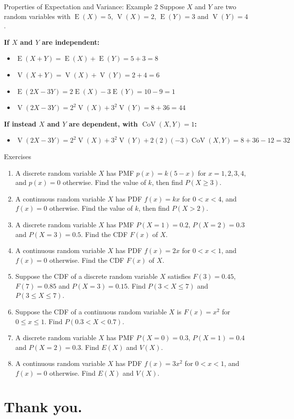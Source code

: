 \documentclass[12pt, aspectratio=169]{beamer}
\DeclareMathOperator{\E}{E}
\DeclareMathOperator{\V}{V}
\begin{document}
	\begin{frame}{Properties of Expectation and Variance: Example 2}
		Suppose $X$ and $Y$ are two random variables with \(\E(X) = 5\), \(\V(X)=2\), \(\E(Y) = 3\) and \(\V(Y) = 4\).

		\vspace{0.5em}

		\textbf{If $X$ and $Y$ are independent:}
		\begin{itemize}
			\item \(\E(X+Y) = \E(X) + \E(Y) = 5 + 3 = 8\)
			\item \(\V(X+Y) = \V(X) + \V(Y) = 2 + 4 = 6\)
			\item \(\E(2X - 3Y) = 2\E(X) - 3\E(Y) = 10 - 9 = 1\)
			\item \(\V(2X - 3Y) = 2^2\V(X) + 3^2\V(Y) = 8 + 36 = 44\)
		\end{itemize}

		\vspace{0.5em}

		\textbf{If instead $X$ and $Y$ are dependent, with \(\operatorname{CoV}(X,Y) = 1\):}
		\begin{itemize}
			\item \(\V(2X - 3Y) = 2^2\V(X) + 3^2\V(Y) + 2(2)(-3)\operatorname{CoV}(X,Y) = 8 + 36 - 12 = 32\)
		\end{itemize}
	\end{frame}


	\begin{frame}[allowframebreaks=0.75]{Exercises}
		\begin{enumerate}
			\item A discrete random variable \(X\) has PMF \(p(x) = k(5-x)\) for \(x = 1, 2, 3, 4\), and \(p(x) = 0\) otherwise. Find the value of \(k\), then find \(P(X \geqslant 3)\).
			\item A continuous random variable \(X\) has PDF \(f(x) = kx\) for \(0 < x < 4\), and \(f(x) = 0\) otherwise. Find the value of \(k\), then find \(P(X>2)\).
			\item A discrete random variable \(X\) has PMF \(P(X=1)=0.2\), \(P(X=2)=0.3\) and \(P(X=3)=0.5\). Find the CDF \(F(x)\) of \(X\).
			\item A continuous random variable \(X\) has PDF \(f(x) = 2x\) for \(0 < x < 1\), and \(f(x)=0\) otherwise. Find the CDF \(F(x)\) of \(X\).
			\item Suppose the CDF of a discrete random variable \(X\) satisfies \(F(3) = 0.45\), \(F(7) = 0.85\) and \(P(X=3) = 0.15\). Find \(P(3 < X \leqslant 7)\) and \(P(3 \leqslant X \leqslant 7)\).
			\item Suppose the CDF of a continuous random variable \(X\) is \(F(x) = x^2\) for \(0 \leqslant x \leqslant 1\). Find \(P(0.3 < X < 0.7)\).
			\item A discrete random variable \(X\) has PMF \(P(X=0) = 0.3\), \(P(X=1) = 0.4\) and \(P(X=2) = 0.3\). Find \(E(X)\) and \(V(X)\).
			\item A continuous random variable \(X\) has PDF \(f(x) = 3x^2\) for \(0 < x < 1\), and \(f(x)=0\) otherwise. Find \(E(X)\) and \(V(X)\).
		\end{enumerate}
	\end{frame}

    \section*{Thank you.}
\end{document}

